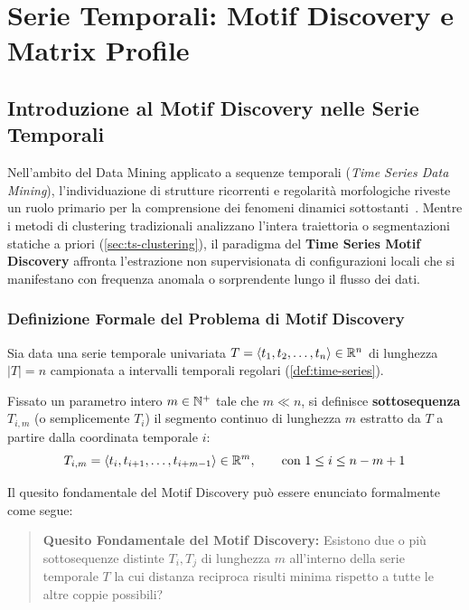 \chapter{Serie Temporali: Motif Discovery e Matrix Profile}
\label{chap:dm-motif-discovery-matrix-profile}

\FloatBarrier
\section{Introduzione al Motif Discovery nelle Serie Temporali}
\label{sec:ts-motif-intro}

Nell'ambito del Data Mining applicato a sequenze temporali (\textit{Time Series Data Mining}), l'individuazione di strutture ricorrenti e regolarit\`a morfologiche riveste un ruolo primario per la comprensione dei fenomeni dinamici sottostanti~\cite{tan2018, yeh2016}. Mentre i metodi di clustering tradizionali analizzano l'intera traiettoria o segmentazioni statiche a priori (\autoref{sec:ts-clustering}), il paradigma del \textbf{Time Series Motif Discovery} affronta l'estrazione non supervisionata di configurazioni locali che si manifestano con frequenza anomala o sorprendente lungo il flusso dei dati.

\FloatBarrier
\subsection{Definizione Formale del Problema di Motif Discovery}
\label{subsec:ts-motif-formal-definition}

Sia data una serie temporale univariata $T = \langle t_1, t_2, \dots, t_n \rangle \in \mathbb{R}^n$ di lunghezza $|T| = n$ campionata a intervalli temporali regolari (\autoref{def:time-series}). 

\begin{definition}
\label{def:ts-subsequence}
Fissato un parametro intero $m \in \mathbb{N}^+$ tale che $m \ll n$, si definisce \textbf{sottosequenza} $T_{i,m}$ (o semplicemente $T_i$) il segmento continuo di lunghezza $m$ estratto da $T$ a partire dalla coordinata temporale $i$:
\begin{equation}
\label{eq:ts-subsequence}
T_{i,m} = \langle t_i, t_{i+1}, \dots, t_{i+m-1} \rangle \in \mathbb{R}^m, \qquad \text{con } 1 \le i \le n - m + 1
\end{equation}
\end{definition}

Il quesito fondamentale del Motif Discovery pu\`o essere enunciato formalmente come segue:
\begin{quote}
\textbf{Quesito Fondamentale del Motif Discovery:} Esistono due o pi\`u sottosequenze distinte $T_i, T_j$ di lunghezza $m$ all'interno della serie temporale $T$ la cui distanza reciproca risulti minima rispetto a tutte le altre coppie possibili?
\end{quote}

